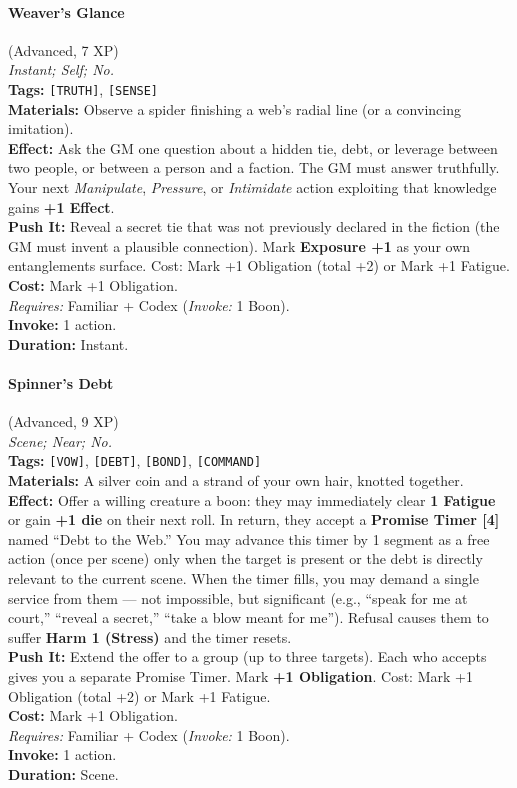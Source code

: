 \paragraph{Weaver's Glance} (Advanced, 7 XP) \hfill \\
\emph{Instant; Self; No.} \\
\textbf{Tags:} \texttt{[TRUTH]}, \texttt{[SENSE]} \\
\textbf{Materials:} Observe a spider finishing a web's radial line (or a convincing imitation). \\
\textbf{Effect:} Ask the GM one question about a hidden tie, debt, or leverage between two people, or between a person and a faction. The GM must answer truthfully. Your next \textit{Manipulate}, \textit{Pressure}, or \textit{Intimidate} action exploiting that knowledge gains \textbf{+1 Effect}. \\
\textbf{Push It:} Reveal a secret tie that was not previously declared in the fiction (the GM must invent a plausible connection). Mark \textbf{Exposure +1} as your own entanglements surface. Cost: Mark +1 Obligation (total +2) or Mark +1 Fatigue. \\
\textbf{Cost:} Mark +1 Obligation. \\
\textit{Requires:} Familiar + Codex (\textit{Invoke:} 1 Boon). \\
\textbf{Invoke:} 1 action. \\
\textbf{Duration:} Instant.

\paragraph{Spinner's Debt} (Advanced, 9 XP) \hfill \\
\emph{Scene; Near; No.} \\
\textbf{Tags:} \texttt{[VOW]}, \texttt{[DEBT]}, \texttt{[BOND]}, \texttt{[COMMAND]} \\
\textbf{Materials:} A silver coin and a strand of your own hair, knotted together. \\
\textbf{Effect:} Offer a willing creature a boon: they may immediately clear \textbf{1 Fatigue} or gain \textbf{+1 die} on their next roll. In return, they accept a \textbf{Promise Timer [4]} named ``Debt to the Web.'' You may advance this timer by 1 segment as a free action (once per scene) only when the target is present or the debt is directly relevant to the current scene. When the timer fills, you may demand a single service from them --- not impossible, but significant (e.g., ``speak for me at court,'' ``reveal a secret,'' ``take a blow meant for me''). Refusal causes them to suffer \textbf{Harm 1 (Stress)} and the timer resets. \\
\textbf{Push It:} Extend the offer to a group (up to three targets). Each who accepts gives you a separate Promise Timer. Mark \textbf{+1 Obligation}. Cost: Mark +1 Obligation (total +2) or Mark +1 Fatigue. \\
\textbf{Cost:} Mark +1 Obligation. \\
\textit{Requires:} Familiar + Codex (\textit{Invoke:} 1 Boon). \\
\textbf{Invoke:} 1 action. \\
\textbf{Duration:} Scene.

